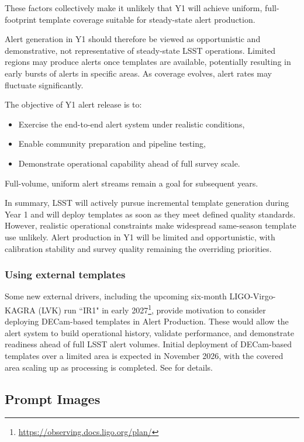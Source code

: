 These factors collectively make it unlikely that Y1 will achieve uniform, full-footprint template coverage suitable for steady-state alert production.

Alert generation in Y1 should therefore be viewed as opportunistic and demonstrative, not representative of steady-state LSST operations.
Limited regions may produce alerts once templates are available, potentially resulting in early bursts of alerts in specific areas.
As coverage evolves, alert rates may fluctuate significantly.

The objective of Y1 alert release is to:
\begin{itemize}

\item Exercise the end-to-end alert system under realistic conditions,

\item Enable community preparation and pipeline testing,

\item Demonstrate operational capability ahead of full survey scale.

\end{itemize}
Full-volume, uniform alert streams remain a goal for subsequent years.

In summary, LSST will actively pursue incremental template generation during Year 1 and will deploy templates as soon as they meet defined quality standards.
However, realistic operational constraints make widespread same-season template use unlikely.
Alert production in Y1 will be limited and opportunistic, with calibration stability and survey quality remaining the overriding priorities.

\subsubsection{Using external templates}
Some new external drivers, including the upcoming six-month LIGO-Virgo-KAGRA (LVK) run ``IR1" in early 2027\footnote{\url{https://observing.docs.ligo.org/plan/}}, provide motivation to consider deploying DECam-based templates in Alert Production.
These would allow the alert system to build operational history, validate performance, and demonstrate readiness ahead of full LSST alert volumes.
Initial deployment of DECam-based templates over a limited area is expected in November 2026, with the covered area scaling up as processing is completed.  
See \citet{DMTN-362} for details.

\subsection{Prompt Images}
\label{ssec:prompt-images}

